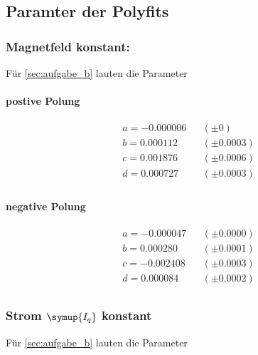 

\subsection{Paramter der Polyfits}
\label{sec:messwert}


\subsubsection{Magnetfeld konstant:} %
Für \ref{sec:aufgabe_b} lauten die Parameter

\vspace{1cm}
\begin{minipage}{0.49\textwidth}
\centering
\paragraph{postive Polung}
\begin{align*}
  &a = -0.000006 &&(\pm 0) \\
  &b = 0.000112 &&(\pm 0.0003)\\
  &c = 0.001876 &&(\pm 0.0006) \\
  &d = 0.000727 &&(\pm 0.0003) \\
\end{align*}
\end{minipage}
\hfill
\begin{minipage}{0.49\textwidth}
\centering
\paragraph{negative Polung}
\begin{align*}
   &a = -0.000047 &&(\pm 0.0000) \\
   &b = 0.000280 &&(\pm 0.0001 ) \\
   &c = -0.002408 &&(\pm 0.0003) \\
   &d = 0.000084 &&(\pm 0.0002 ) \\
\end{align*}
\end{minipage}

\subsubsection{Strom $\symup{I_q}$ konstant}
Für \ref{sec:aufgabe_b} lauten die Parameter
\vspace{1cm}


